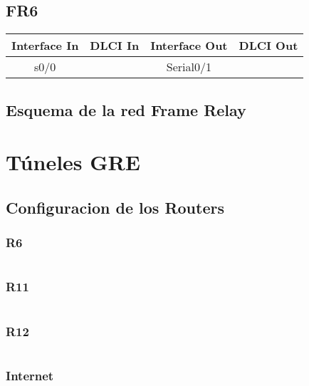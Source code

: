 \documentclass[12pt,a4paper,spanish]{article}
\begin{document}
\subsection{FR6}
\begin{tabular}{|c|c|c|c|}
\hline
Interface In & DLCI In & Interface Out & DLCI Out \\
\hline
\hline
 s0/0 &  & Serial0/1 &  \\
\hline
\end{tabular}

\newpage
\subsection{Esquema de la red Frame Relay}


\newpage
\section{Túneles GRE}
\subsection{Configuracion de los Routers}
\subsubsection{R6}
{\small
\begin{verbatim}

\end{verbatim}
}

\subsubsection{R11}
{\small
\begin{verbatim}

\end{verbatim}
}

\subsubsection{R12}
{\small
\begin{verbatim}

\end{verbatim}
}

\subsubsection{Internet}
\end{document}
